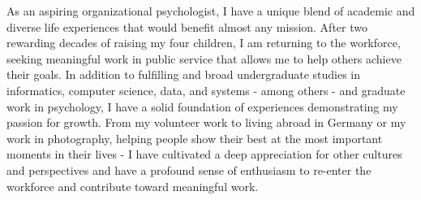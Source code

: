 
\vspace{-0.5em}

\begin{cventries}
\raggedright \textcolor{libertyblue}{
\small As an aspiring organizational psychologist, I have a unique blend of academic and diverse life experiences that would benefit almost any mission. After two rewarding decades of raising my four children, I am returning to the workforce, seeking meaningful work in public service that allows me to help others achieve their goals. In addition to fulfilling and broad undergraduate studies in informatics, computer science, data, and systems - among others - and graduate work in psychology, I have a solid foundation of experiences demonstrating my passion for growth. From my volunteer work to living abroad in Germany or my work in photography, helping people show their best at the most important moments in their lives - I have cultivated a deep appreciation for other cultures and perspectives and have a profound sense of enthusiasm to re-enter the workforce and contribute toward meaningful work.}
\end{cventries}